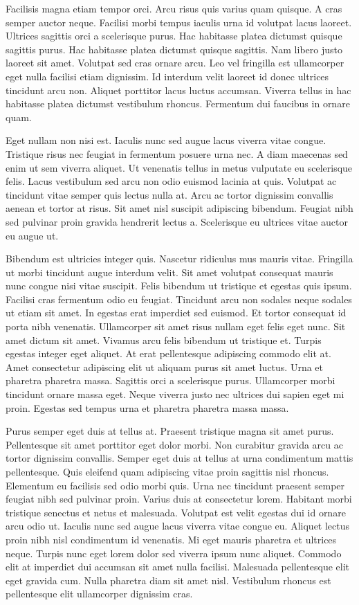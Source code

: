 \documentclass[12pt, oneside, a4paper]{article}
\begin{document}
Facilisis magna etiam tempor orci. Arcu risus quis varius quam quisque. A cras semper auctor neque. Facilisi morbi tempus iaculis urna id volutpat lacus laoreet. Ultrices sagittis orci a scelerisque purus. Hac habitasse platea dictumst quisque sagittis purus. Hac habitasse platea dictumst quisque sagittis. Nam libero justo laoreet sit amet. Volutpat sed cras ornare arcu. Leo vel fringilla est ullamcorper eget nulla facilisi etiam dignissim. Id interdum velit laoreet id donec ultrices tincidunt arcu non. Aliquet porttitor lacus luctus accumsan. Viverra tellus in hac habitasse platea dictumst vestibulum rhoncus. Fermentum dui faucibus in ornare quam.

Eget nullam non nisi est. Iaculis nunc sed augue lacus viverra vitae congue. Tristique risus nec feugiat in fermentum posuere urna nec. A diam maecenas sed enim ut sem viverra aliquet. Ut venenatis tellus in metus vulputate eu scelerisque felis. Lacus vestibulum sed arcu non odio euismod lacinia at quis. Volutpat ac tincidunt vitae semper quis lectus nulla at. Arcu ac tortor dignissim convallis aenean et tortor at risus. Sit amet nisl suscipit adipiscing bibendum. Feugiat nibh sed pulvinar proin gravida hendrerit lectus a. Scelerisque eu ultrices vitae auctor eu augue ut.

Bibendum est ultricies integer quis. Nascetur ridiculus mus mauris vitae. Fringilla ut morbi tincidunt augue interdum velit. Sit amet volutpat consequat mauris nunc congue nisi vitae suscipit. Felis bibendum ut tristique et egestas quis ipsum. Facilisi cras fermentum odio eu feugiat. Tincidunt arcu non sodales neque sodales ut etiam sit amet. In egestas erat imperdiet sed euismod. Et tortor consequat id porta nibh venenatis. Ullamcorper sit amet risus nullam eget felis eget nunc. Sit amet dictum sit amet. Vivamus arcu felis bibendum ut tristique et. Turpis egestas integer eget aliquet. At erat pellentesque adipiscing commodo elit at. Amet consectetur adipiscing elit ut aliquam purus sit amet luctus. Urna et pharetra pharetra massa. Sagittis orci a scelerisque purus. Ullamcorper morbi tincidunt ornare massa eget. Neque viverra justo nec ultrices dui sapien eget mi proin. Egestas sed tempus urna et pharetra pharetra massa massa.

Purus semper eget duis at tellus at. Praesent tristique magna sit amet purus. Pellentesque sit amet porttitor eget dolor morbi. Non curabitur gravida arcu ac tortor dignissim convallis. Semper eget duis at tellus at urna condimentum mattis pellentesque. Quis eleifend quam adipiscing vitae proin sagittis nisl rhoncus. Elementum eu facilisis sed odio morbi quis. Urna nec tincidunt praesent semper feugiat nibh sed pulvinar proin. Varius duis at consectetur lorem. Habitant morbi tristique senectus et netus et malesuada. Volutpat est velit egestas dui id ornare arcu odio ut. Iaculis nunc sed augue lacus viverra vitae congue eu. Aliquet lectus proin nibh nisl condimentum id venenatis. Mi eget mauris pharetra et ultrices neque. Turpis nunc eget lorem dolor sed viverra ipsum nunc aliquet. Commodo elit at imperdiet dui accumsan sit amet nulla facilisi. Malesuada pellentesque elit eget gravida cum. Nulla pharetra diam sit amet nisl. Vestibulum rhoncus est pellentesque elit ullamcorper dignissim cras.
\end{document}
